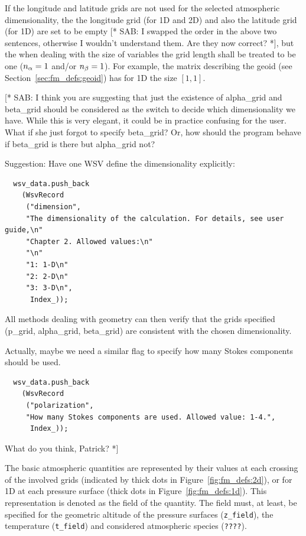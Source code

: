 If the longitude and latitude grids are not used for the selected
atmospheric dimensionality, the the longitude grid (for 1D and 2D) and
also the latitude grid (for 1D) are set to be empty [* SAB: I swapped
the order in the above two sentences, otherwise I wouldn't understand
them. Are they now correct? *], but the when dealing with the size of
variables the grid length shall be treated to be one
($n_{\alpha}=1$ and/or $n_{\beta}=1$). For example, the
matrix describing the geoid (see Section~\ref{sec:fm_defs:geoid}) has
for 1D the size $[1,1]$.

[* SAB: I think you are suggesting that just the existence of alpha\_grid
and beta\_grid should be considered as the switch to decide which
dimensionality we have. While this is very elegant, it could be in
practice confusing for the user. What if she just forgot to specify
beta\_grid? Or, how should the program behave if beta\_grid is there but
alpha\_grid not?

Suggestion: Have one WSV define the dimensionality explicitly:

\begin{verbatim}
  wsv_data.push_back
    (WsvRecord
     ("dimension",
     "The dimensionality of the calculation. For details, see user guide,\n"
     "Chapter 2. Allowed values:\n"
     "\n"
     "1: 1-D\n"
     "2: 2-D\n"
     "3: 3-D\n",
      Index_));
\end{verbatim}
      
All methods dealing with geometry can then verify that the grids
specified (p\_grid, alpha\_grid, beta\_grid) are consistent with
the chosen dimensionality.

Actually, maybe we need a similar flag to specify how many Stokes
components should be used.

\begin{verbatim}
  wsv_data.push_back
    (WsvRecord
     ("polarization",
     "How many Stokes components are used. Allowed value: 1-4.",
      Index_));
\end{verbatim}

What do you think, Patrick? *]

The basic atmospheric quantities are represented by their values at
each crossing of the involved grids (indicated by thick dots in
Figure~\ref{fig:fm_defs:2d}), or for 1D at each pressure surface
(thick dots in Figure~\ref{fig:fm_defs:1d}). This representation is
denoted as the field of the quantity. The field must, at least, be
specified for the geometric altitude of the pressure surfaces
(\verb|z_field|), the temperature (\verb|t_field|) and considered
atmospheric species (\verb|????|).

